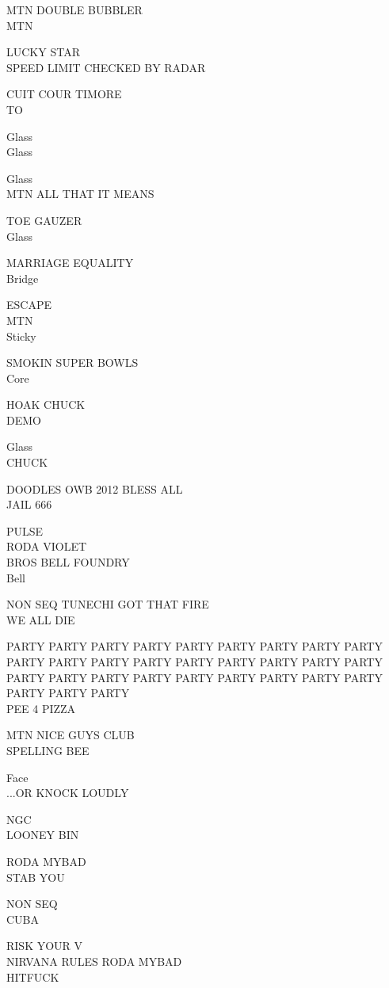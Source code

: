 \documentclass[10pt,letterpaper]{article}
\begin{document}
MTN DOUBLE BUBBLER\\
MTN

LUCKY STAR\\
SPEED LIMIT CHECKED BY RADAR

CUIT COUR TIMORE\\
TO

Glass\\
Glass

Glass\\
MTN ALL THAT IT MEANS

TOE GAUZER\\
Glass

MARRIAGE EQUALITY\\
Bridge

ESCAPE\\
MTN\\
Sticky

SMOKIN SUPER BOWLS\\
Core

HOAK CHUCK\\
DEMO

Glass\\
CHUCK

DOODLES OWB 2012 BLESS ALL\\
JAIL 666

PULSE\\
RODA VIOLET\\
BROS BELL FOUNDRY\\
Bell

NON SEQ TUNECHI GOT THAT FIRE\\
WE ALL DIE

PARTY PARTY PARTY PARTY PARTY PARTY PARTY PARTY PARTY PARTY PARTY PARTY PARTY PARTY PARTY PARTY PARTY PARTY PARTY PARTY PARTY PARTY PARTY PARTY PARTY PARTY PARTY PARTY PARTY PARTY\\
PEE 4 PIZZA

MTN NICE GUYS CLUB\\
SPELLING BEE

Face\\
...OR KNOCK LOUDLY

NGC\\
LOONEY BIN

RODA MYBAD\\
STAB YOU

NON SEQ\\
CUBA

RISK YOUR V\\
NIRVANA RULES RODA MYBAD\\
HITFUCK
\end{document}

